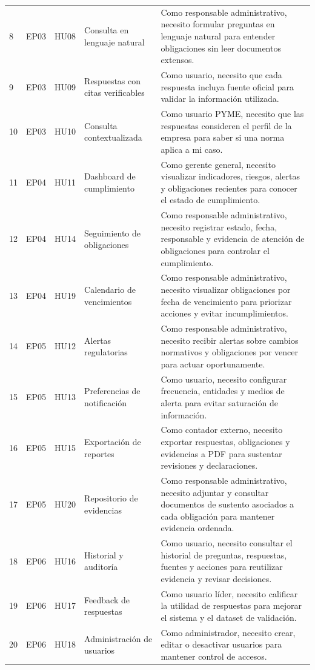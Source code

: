 \documentclass[12pt,a4paper,oneside]{report}
\begin{document}
\begin{longtable}{p{}p{}p{}p{}p{}}
8 & EP03 & HU08 & Consulta en lenguaje natural & Como responsable administrativo, necesito formular preguntas en lenguaje natural para entender obligaciones sin leer documentos extensos. \\
9 & EP03 & HU09 & Respuestas con citas verificables & Como usuario, necesito que cada respuesta incluya fuente oficial para validar la información utilizada. \\
10 & EP03 & HU10 & Consulta contextualizada & Como usuario PYME, necesito que las respuestas consideren el perfil de la empresa para saber si una norma aplica a mi caso. \\
11 & EP04 & HU11 & Dashboard de cumplimiento & Como gerente general, necesito visualizar indicadores, riesgos, alertas y obligaciones recientes para conocer el estado de cumplimiento. \\
12 & EP04 & HU14 & Seguimiento de obligaciones & Como responsable administrativo, necesito registrar estado, fecha, responsable y evidencia de atención de obligaciones para controlar el cumplimiento. \\
13 & EP04 & HU19 & Calendario de vencimientos & Como responsable administrativo, necesito visualizar obligaciones por fecha de vencimiento para priorizar acciones y evitar incumplimientos. \\
14 & EP05 & HU12 & Alertas regulatorias & Como responsable administrativo, necesito recibir alertas sobre cambios normativos y obligaciones por vencer para actuar oportunamente. \\
15 & EP05 & HU13 & Preferencias de notificación & Como usuario, necesito configurar frecuencia, entidades y medios de alerta para evitar saturación de información. \\
16 & EP05 & HU15 & Exportación de reportes & Como contador externo, necesito exportar respuestas, obligaciones y evidencias a PDF para sustentar revisiones y declaraciones. \\
17 & EP05 & HU20 & Repositorio de evidencias & Como responsable administrativo, necesito adjuntar y consultar documentos de sustento asociados a cada obligación para mantener evidencia ordenada. \\
18 & EP06 & HU16 & Historial y auditoría & Como usuario, necesito consultar el historial de preguntas, respuestas, fuentes y acciones para reutilizar evidencia y revisar decisiones. \\
19 & EP06 & HU17 & Feedback de respuestas & Como usuario líder, necesito calificar la utilidad de respuestas para mejorar el sistema y el dataset de validación. \\
20 & EP06 & HU18 & Administración de usuarios & Como administrador, necesito crear, editar o desactivar usuarios para mantener control de accesos. \\
\bottomrule
\end{longtable}
\end{document}
